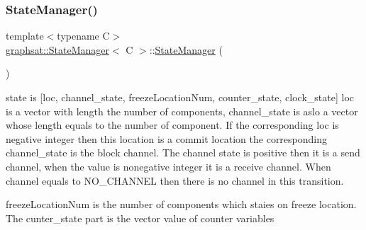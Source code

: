 \subsubsection{\texorpdfstring{StateManager()}{StateManager()}\hspace{0.1cm}{\footnotesize\ttfamily [1/2]}}
{\footnotesize\ttfamily template$<$typename C$>$ \\
\mbox{\hyperlink{classgraphsat_1_1_state_manager}{graphsat\+::\+State\+Manager}}$<$ C $>$\+::\mbox{\hyperlink{classgraphsat_1_1_state_manager}{State\+Manager}} (\begin{DoxyParamCaption}{ }\end{DoxyParamCaption})\hspace{0.3cm}{\ttfamily [inline]}}

state is \mbox{[}loc, channel\+\_\+state, freeze\+Location\+Num, counter\+\_\+state, clock\+\_\+state\mbox{]} loc is a vector with length the number of components, channel\+\_\+state is aslo a vector whose length equals to the number of component. If the corresponding loc is negative integer then this location is a commit location the corresponding channel\+\_\+state is the block channel. The channel state is positive then it is a send channel, when the value is nonegative integer it is a receive channel. When channel equals to N\+O\+\_\+\+C\+H\+A\+N\+N\+EL then there is no channel in this transition.

freeze\+Location\+Num is the number of components which staies on freeze location. The cunter\+\_\+state part is the vector value of counter variables \mbox{\label{classgraphsat_1_1_state_manager_a509b6cdb2ca6f5d7b0d2a337433c6fb4}} 
